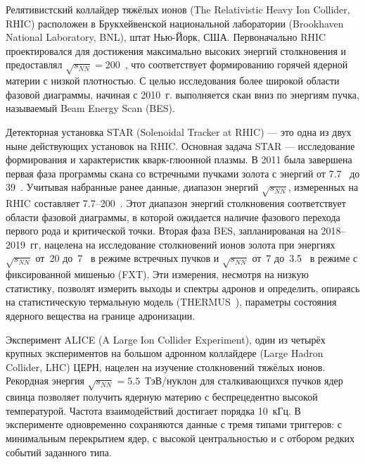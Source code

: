 \bigskip




Релятивистский коллайдер тяжёлых ионов (The Relativistic Heavy Ion Collider, RHIC) расположен в Брукхейвенской национальной лаборатории (Brookhaven National Laboratory, BNL), штат Нью-Йорк, США. Первоначально RHIC проектировался для достижения максимально высоких энергий столкновения и предоставлял $\sqrt{s_{NN}}=200$~\GeVperNucl, что соответствует формированию горячей ядерной материи с низкой плотностью. С целью исследования более широкой области фазовой диаграммы, начиная с 2010~г. выполняется скан вниз по энергиям пучка, называемый Beam Energy Scan (BES).

Детекторная установка STAR (Solenoidal Tracker at RHIC) --- это одна из двух ныне действующих установок на RHIC. Основная задача STAR --- исследование формирования и характеристик кварк-глюонной плазмы. В 2011 была завершена первая фаза программы скана со встречными пучками золота с энергий от 7.7~\GeVperNucl{} до 39~\GeVperNucl. Учитывая набранные ранее данные, диапазон энергий $\sqrt{s_{NN}}$, измеренных на RHIC составляет 7.7--200~\GeVperNucl. Этот диапазон энергий столкновения соответствует области фазовой диаграммы, в которой ожидается наличие фазового перехода первого рода и критической точки. Вторая фаза BES, запланированая на 2018--2019~гг, нацелена на исследование столкновений ионов золота при энергиях $\sqrt{s_{NN}}$ от~20 до~7~\GeVperNucl{} в режиме встречных пучков и $\sqrt{s_{NN}}$ от~7 до~3.5~\GeVperNucl{} в режиме с фиксированной мишенью (FXT). Эти измерения, несмотря на низкую статистику, позволят измерить выходы и спектры адронов и определить, опираясь на статистическую термальную модель (THERMUS~\cite{}), параметры состояния ядерного вещества на границе адронизации.

\bigskip



Эксперимент ALICE (A Large Ion Collider Experiment), один из четырёх крупных экспериментов на большом адронном коллайдере (Large Hadron Collider, LHC) ЦЕРН, нацелен на изучение столкновений тяжёлых ионов. Рекордная энергия $\sqrt{s_{NN}}=5.5$~\mbox{ТэВ/нуклон} для сталкивающихся пучков ядер свинца позволяет получить ядерную материю с беспрецедентно высокой температурой. Частота взаимодействий достигает порядка 10~кГц. В эксперименте одновременно сохраняются данные с тремя типами триггеров: с минимальным перекрытием ядер, с высокой центральностью и с отбором редких событий заданного типа.

